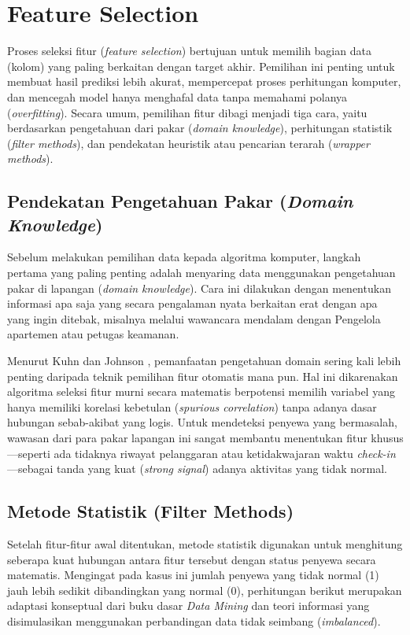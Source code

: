 \section{Feature Selection}\label{sec:feature_selection}

Proses seleksi fitur (\textit{feature selection}) bertujuan untuk memilih bagian data (kolom) yang paling berkaitan dengan target akhir. Pemilihan ini penting untuk membuat hasil prediksi lebih akurat, mempercepat proses perhitungan komputer, dan mencegah model hanya menghafal data tanpa memahami polanya (\textit{overfitting}). Secara umum, pemilihan fitur dibagi menjadi tiga cara, yaitu berdasarkan pengetahuan dari pakar (\textit{domain knowledge}), perhitungan statistik (\textit{filter methods}), dan pendekatan heuristik atau pencarian terarah (\textit{wrapper methods}).

\subsection{Pendekatan Pengetahuan Pakar (\textit{Domain Knowledge})}
Sebelum melakukan pemilihan data kepada algoritma komputer, langkah pertama yang paling penting adalah menyaring data menggunakan pengetahuan pakar di lapangan (\textit{domain knowledge}). Cara ini dilakukan dengan menentukan informasi apa saja yang secara pengalaman nyata berkaitan erat dengan apa yang ingin ditebak, misalnya melalui wawancara mendalam dengan Pengelola apartemen atau petugas keamanan.

Menurut Kuhn dan Johnson  \cite{kuhn2013applied}, pemanfaatan pengetahuan domain sering kali lebih penting daripada teknik pemilihan fitur otomatis mana pun. Hal ini dikarenakan algoritma seleksi fitur murni secara matematis berpotensi memilih variabel yang hanya memiliki korelasi kebetulan (\textit{spurious correlation}) tanpa adanya dasar hubungan sebab-akibat yang logis. Untuk mendeteksi penyewa yang bermasalah, wawasan dari para pakar lapangan ini sangat membantu menentukan fitur khusus---seperti ada tidaknya riwayat pelanggaran atau ketidakwajaran waktu \textit{check-in}---sebagai tanda yang kuat (\textit{strong signal}) adanya aktivitas yang tidak normal.

\subsection{Metode Statistik (Filter Methods)}
Setelah fitur-fitur awal ditentukan, metode statistik digunakan untuk menghitung seberapa kuat hubungan antara fitur tersebut dengan status penyewa secara matematis. Mengingat pada kasus ini jumlah penyewa yang tidak normal (1) jauh lebih sedikit dibandingkan yang normal (0), perhitungan berikut merupakan adaptasi konseptual dari buku dasar \textit{Data Mining} \cite{han2011data} dan teori informasi \cite{cover2006elements} yang disimulasikan menggunakan perbandingan data tidak seimbang (\textit{imbalanced}).
    
